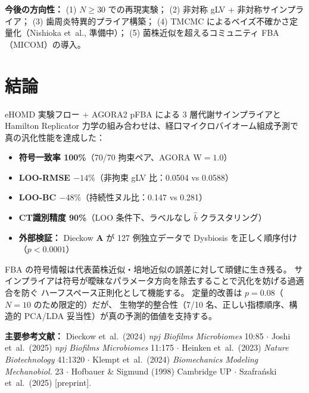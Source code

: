 \documentclass[10pt,a4paper]{article}
\newcommand{\bA}{\mathbf{A}}
\begin{document}
\textbf{今後の方向性：}
(1) $N \geq 30$ での再現実験；
(2) 非対称 gLV + 非対称サインプライア；
(3) 歯周炎特異的プライア構築；
(4) TMCMC によるベイズ不確かさ定量化（Nishioka et~al., 準備中）；
(5) 菌株近似を超えるコミュニティ FBA（MICOM）の導入。

\section{結論}

\begin{keybox}[まとめ]
eHOMD 実験フロー + AGORA2 pFBA による 3 層代謝サインプライアと
Hamilton Replicator 力学の組み合わせは、経口マイクロバイオーム組成予測で真の汎化性能を達成した：
\begin{itemize}[noitemsep]
  \item \textbf{符号一致率 100\%}（70/70 拘束ペア、AGORA W$=1.0$）
  \item \textbf{LOO-RMSE $-14\%$}（非拘束 gLV 比：0.0504 vs 0.0588）
  \item \textbf{LOO-BC $-48\%$}（持続性ヌル比：0.147 vs 0.281）
  \item \textbf{CT識別精度 90\%}（LOO 条件下、ラベルなし $\hat b$ クラスタリング）
  \item \textbf{外部検証：} Dieckow $\bA$ が 127 例独立データで Dysbiosis を正しく順序付け（$p<0.0001$）
\end{itemize}
FBA の符号情報は代表菌株近似・培地近似の誤差に対して頑健に生き残る。
サインプライアは符号が曖昧なパラメータ方向を除去することで汎化を妨げる過適合を防ぐ
ハーフスペース正則化として機能する。
定量的改善は $p=0.08$（$N=10$ のため限定的）だが、
生物学的整合性（7/10 名、正しい指標順序、構造的 PCA/LDA 妥当性）が真の予測的価値を支持する。
\end{keybox}

\bigskip
\noindent\small\textbf{主要参考文献：}
Dieckow et~al.~(2024) \textit{npj Biofilms Microbiomes} 10:85 $\cdot$
Joshi et~al.~(2025) \textit{npj Biofilms Microbiomes} 11:175 $\cdot$
Heinken et~al.~(2023) \textit{Nature Biotechnology} 41:1320 $\cdot$
Klempt et~al.~(2024) \textit{Biomechanics Modeling Mechanobiol.} 23 $\cdot$
Hofbauer \& Sigmund (1998) Cambridge UP $\cdot$
Szafra\'{n}ski et~al.~(2025) [preprint].
\end{document}
